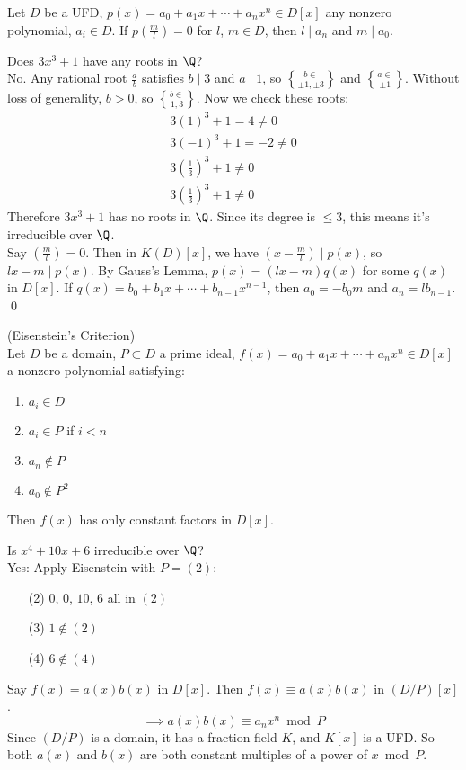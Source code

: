 \thm Let $D$ be a UFD, $p(x)=a_0+a_1x+\dotsb+a_nx^n\in D[x]$ any nonzero polynomial, $a_i\in D$.  If $p(\frac ml)=0$ for $l$, $m\in D$, then $l\mid a_n$ and $m\mid a_0$.

\eg Does $3x^3+1$ have any roots in $\Q$? \\
\ans No.  Any rational root $\frac ab$ satisfies $b\mid3$ and $a\mid1$, so $b\in\brace{\pm1,\pm3}$ and $a\in\brace{\pm1}$.  Without loss of generality, $b>0$, so $b\in\brace{1,3}$.  Now we check these roots:
\begin{gather*}
3(1)^3 + 1 = 4 \neq 0 \\
3(-1)^3 + 1 = -2 \neq 0 \\
3(\tfrac13)^3 + 1 \neq 0 \\
3(\tfrac13)^3 + 1 \neq 0
\end{gather*}
Therefore $3x^3+1$ has no roots in $\Q$.  Since its degree is $\leq3$, this means it's irreducible over $\Q$. \\
\pf Say $(\tfrac ml)=0$.  Then in $K(D)[x]$, we have $(x-\tfrac ml)\mid p(x)$, so $lx-m\mid p(x)$.  By Gauss's Lemma, $p(x)=(lx-m)q(x)$ for some $q(x)$ in $D[x]$.  If $q(x)=b_0+b_1x+\dotsb+b_{n-1}x^{n-1}$, then $a_0=-b_0m$ and $a_n=lb_{n-1}$. \qed

\thm (Eisenstein's Criterion) \\
Let $D$ be a domain, $P\subset D$ a prime ideal, $f(x)=a_0+a_1x+\dotsb+a_n x^n\in D[x]$ a nonzero polynomial satisfying:
\begin{enumerate}[label=(\arabic*)]
\item $a_i\in D$
\item $a_i\in P$ if $i<n$
\item $a_n\notin P$
\item $a_0\notin P^2$
\end{enumerate}%
Then $f(x)$ has only constant factors in $D[x]$.

\eg Is $x^4+10x+6$ irreducible over $\Q$? \\
Yes: Apply Eisenstein with $P=(2)$:
\begin{enumerate}%
\item[(2)] $0$, $0$, $10$, $6$ all in $(2)$
\item[(3)] $1\notin(2)$
\item[(4)] $6\notin(4)$ \checkmark
\end{enumerate}
\pf Say $f(x)=a(x)b(x)$ in $D[x]$.  Then $f(x)\equiv a(x)b(x)$ in $(D/P)[x]$.
\[ \implies a(x)b(x) \equiv a_n x^n \bmod P \]
Since $(D/P)$ is a domain, it has a fraction field $K$, and $K[x]$ is a UFD.  So both $a(x)$ and $b(x)$ are both constant multiples of a power of $x\bmod P$.

